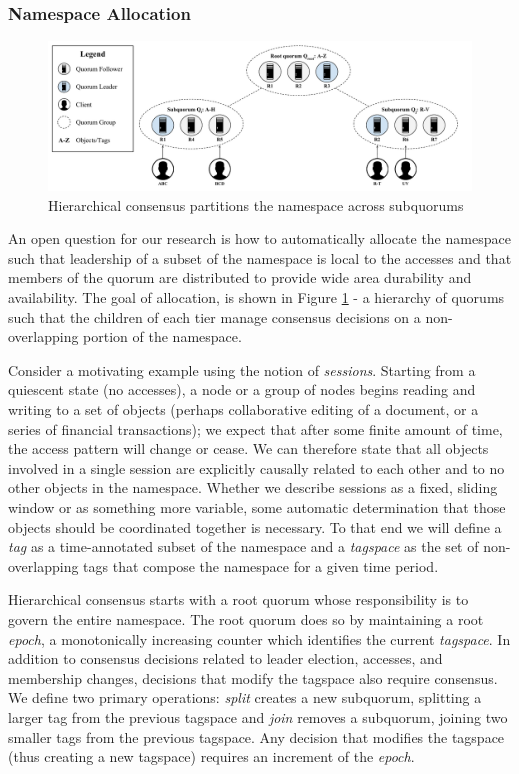 \documentclass{article}
\begin{document}
\subsubsection{Namespace Allocation}
\label{sec:namespace_allocation}

\begin{figure}
    \centering
        \includegraphics[width=.9\textwidth]{figures/hierarchical}
        \caption{Hierarchical consensus partitions the namespace across subquorums}
        \label{fig:hierarchical}
\end{figure}

An open question for our research is how to automatically allocate the namespace such that leadership of a subset of the namespace is local to the accesses and that members of the quorum are distributed to provide wide area durability and availability. The goal of allocation, is shown in Figure \ref{fig:hierarchical} - a hierarchy of quorums such that the children of each tier manage consensus decisions on a non-overlapping portion of the namespace.

Consider a motivating example using the notion of \textit{sessions}. Starting from a quiescent state (no accesses), a node or a group of nodes begins reading and writing to a set of objects (perhaps collaborative editing of a document, or a series of financial transactions); we expect that after some finite amount of time, the access pattern will change or cease. We can therefore state that all objects involved in a single session are explicitly causally related to each other and to no other objects in the namespace. Whether we describe sessions as a fixed, sliding window or as something more variable, some automatic determination that those objects should be coordinated together is necessary. To that end we will define a \textit{tag} as a time-annotated subset of the namespace and a \textit{tagspace} as the set of non-overlapping tags that compose the namespace for a given time period.

Hierarchical consensus starts with a root quorum whose responsibility is to govern the entire namespace. The root quorum does so by maintaining a root \textit{epoch}, a monotonically increasing counter which identifies the current \textit{tagspace}. In addition to consensus decisions related to leader election, accesses, and membership changes, decisions that modify the tagspace also require consensus. We define two primary operations: \textit{split} creates a new subquorum, splitting a larger tag from the previous tagspace and \textit{join} removes a subquorum, joining two smaller tags from the previous tagspace. Any decision that modifies the tagspace (thus creating a new tagspace) requires an increment of the \textit{epoch}.
\end{document}
